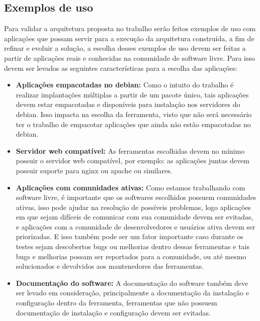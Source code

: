 \subsection{Exemplos de uso}
\label{section:validacao}

Para validar a arquitetura proposta no trabalho serão feitos exemplos de uso
com aplicações que possam servir para a execução da arquitetura construída, a
fim de refinar e evoluir a solução, a escolha desses exemplos de uso devem ser
feitas a partir de aplicações reais e conhecidas na comunidade de software livre.
 Para isso devem ser levados as seguintes características para a escolha das aplicações:

\begin{itemize}
  \item  \textbf{Aplicações empacotadas no debian:}  Como o intuito do trabalho
  é realizar implantações múltiplas a partir de um pacote único, tais aplicações
  devem estar empacotadas e disponíveis para instalação nos servidores do debian.
  Isso impacta na escolha da ferramenta, visto que não será necessário ter o trabalho
  de empacotar aplicações que ainda não estão empacotadas no debian.
  \item  \textbf{Servidor web compatível:} As ferramentas escolhidas devem no
  mínimo possuir o servidor web compatível, por exemplo: as aplicações juntas
  devem possuir suporte para nginx ou apache ou similares.
  \item  \textbf{Aplicações com comunidades ativas:} Como estamos trabalhando
  com software livre, é importante que os softwares escolhidos possuem comunidades
  ativas, isso pode ajudar na resolução de  possíveis problemas, logo aplicações
  em que sejam difíceis de comunicar com sua comunidade devem ser evitadas, e
  aplicações com a comunidade de desenvolvedores e usuários ativa devem ser priorizadas.
  E isso também pode ser um fator importante caso durante os testes sejam descobertos
  bugs ou melhorias dentro dessas ferramentas e tais bugs e melhorias possam ser
  reportados para a comunidade, ou até mesmo solucionados e devolvidos aos mantenedores
  das ferramentas.
  \item  \textbf{Documentação do software:} A documentação do software também deve
  ser levado em consideração, principalmente a documentação da instalação e configuração
  dentro da ferramenta, ferramentas que não possuem documentação de instalação e
  configuração devem ser evitadas.
\end{itemize}

